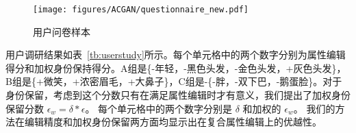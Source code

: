 

\begin{figure}[!t]
    \begin{center}
         \texttt{[image: figures/ACGAN/questionnaire\_new.pdf]}
    \end{center}
    \caption{用户问卷样本}
    \label{fig:questionnaire}
\end{figure}

用户调研结果如表~\ref{tb:userstudy}所示。每个单元格中的两个数字分别为属性编辑得分和加权身份保持得分。A组是\{-年轻，-黑色头发，-金色头发，+灰色头发\}，B组是\{+微笑，+浓密眉毛，+大鼻子\}，C组是-\{-胖，-双下巴，-鹅蛋脸\}。对于身份保留，考虑到这个分数只有在满足属性编辑时才有意义，我们提出了加权身份保留分数 $\epsilon_w = \delta * \epsilon$。 每个单元格中的两个数字分别是 $\delta$ 和加权的 $\epsilon_w$。 我们的方法在编辑精度和加权身份保留两方面均显示出在复合属性编辑上的优越性。 

